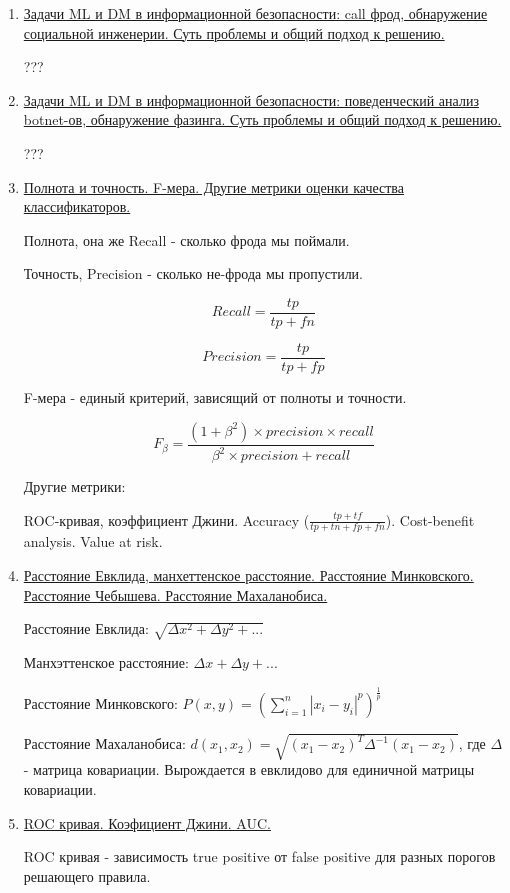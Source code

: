 \documentclass{proc}
\begin{document}
\begin{enumerate}
		\item \uline{Задачи ML и DM в информационной безопасности: call фрод, обнаружение социальной инженерии. Суть проблемы и общий подход к решению.}
		
		???
		
		\item \uline{Задачи ML и DM в информационной безопасности: поведенческий анализ botnet-ов, обнаружение фазинга. Суть проблемы и общий подход к решению.}
		
		???
		
		\item \uline{Полнота и точность. F-мера. Другие метрики оценки качества классификаторов.}
		
		
		
		Полнота, она же Recall - сколько фрода мы поймали.
		
		Точность, Precision - сколько не-фрода мы пропустили.
		
		$$Recall = \frac{tp}{tp+fn}$$
		
		$$Precision = \frac{tp}{tp+fp}$$
		
		F-мера - единый критерий, зависящий от полноты и точности.
		
		$$F_\beta = \frac{(1+\beta^2) \times precision \times recall}{\beta^2 \times precision + recall}$$
		
		Другие метрики:
		
		ROC-кривая, коэффициент Джини. Accuracy ($\frac{tp+tf}{tp+tn+fp+fn}$). Cost-benefit analysis. Value at risk.
		
		
		\item \uline{Расстояние Евклида, манхеттенское расстояние. Расстояние Минковского. Расстояние Чебышева. Расстояние Махаланобиса.}
		
		Расстояние Евклида: $\sqrt{\Delta x^2 + \Delta y^2 + ...}$
		
		Манхэттенское расстояние: $\Delta x + \Delta y + ...$
		
		Расстояние Минковского: $P(x,y)=(\sum_{i=1}^{n}|x_i-y_i|^p)^\frac{1}{p}$
		
		Расстояние Махаланобиса: $d(x_1,x_2)=\sqrt{(x_1-x_2)^T \Delta^{-1} (x_1-x_2)}$, где $\Delta$ - матрица ковариации. Вырождается в евклидово для единичной матрицы ковариации.
		
		\item \uline{ROC кривая. Коэфициент Джини. AUC.}
		
		ROC кривая - зависимость true positive от false positive для разных порогов решающего правила.
		

\end{enumerate}
\end{document}

